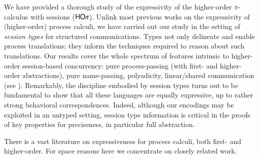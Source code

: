 
We have provided a thorough study of the expressivity of the higher-order $\pi$-calculus with sessions ($\mathsf{HO}\pi$).
Unlink most previous works on the expressivity of 
(higher-order) process calculi, we have carried out our study in the setting of \emph{session types} for structured communications.
Types not only delineate and enable process translations; they 
inform the techniques required to reason about such translations.
Our results cover the whole spectrum of features intrinsic to higher-order session-based concurrency:
pure process-passing (with first- and higher-order abstractions), pure name-passing, polyadicity, 
linear/shared communication (see ). 
Remarkably, the discipline embodied by 
session types turns out to be fundamental to show that all these languages are equally expressive, up to 
rather strong behavioral correspondences. Indeed, although our encodings may be exploited in an untyped setting,
session type information is critical in the proofs of key properties for preciseness, in particular full abstraction.

There is a vast literature on expressiveness for process calculi, both 
first- and higher-order. 
For space reasons here we concentrate on closely related work.

